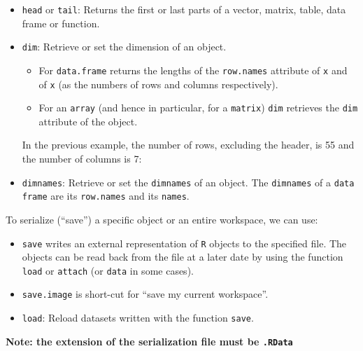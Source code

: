 \documentclass[a4paper]{article}
\newcommand{\dquotes}[1]{``#1''}
\begin{document}
    \begin{itemize}
        \item \texttt{head} or \texttt{tail}: Returns the first or last parts of a vector, matrix, table, data frame or function.
        

        \item \texttt{dim}: Retrieve or set the dimension of an object.
        \begin{itemize}
            \item For \texttt{data.frame} returns the lengths of the \texttt{row.names} attribute of \texttt{x} and of \texttt{x} (as the numbers of rows and columns respectively).

            \item For an \texttt{array} (and hence in particular, for a \texttt{matrix}) \texttt{dim} retrieves the \texttt{dim} attribute of the object.
        \end{itemize}
        In the previous example, the number of rows, excluding the header, is 55 and the number of columns is 7:
        

        \newpage

        \item \texttt{dimnames}: Retrieve or set the \texttt{dimnames} of an object. The \texttt{dimnames} of a \texttt{data frame} are its \texttt{row.names} and its \texttt{names}.
        
    \end{itemize}
    To serialize (\dquotes{save}) a specific object or an entire workspace, we can use:
    \begin{itemize}
        \item \texttt{save} writes an external representation of \texttt{R} objects to the specified file. The objects can be read back from the file at a later date by using the function \texttt{load} or \texttt{attach} (or \texttt{data} in some cases).
        
        \item \texttt{save.image} is short-cut for \dquotes{save my current workspace}.

        \item \texttt{load}: Reload datasets written with the function \texttt{save}.
    \end{itemize}
    \textbf{Note: the extension of the serialization file must be \texttt{.RData}}
\end{document}
